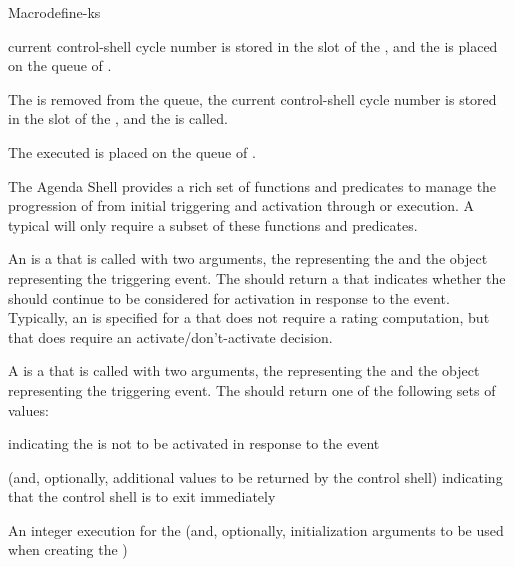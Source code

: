 \documentclass[10pt,twoside,english,pdftex]{article}
\begin{document}
\begin{functiondoc}{Macro}{define-ks}
\begin{tightitemize}
  current control-shell cycle number is stored in the
   slot of the , and the is
  placed on the queue of .
\item The  is removed from the  queue,
  the current control-shell cycle number is stored in the
   slot of the  ,
  and the  is called.
\item The executed  is placed on the queue of
  .
\end{tightitemize}


%
%
%
%
%
%
%
The Agenda Shell provides a rich set of  functions and predicates to
manage the progression of  from initial triggering and activation
through  or execution.  A typical  will only
require a subset of these functions and predicates.

An  is a  that is called with two
arguments, the  representing the  and the
object representing the triggering event.  The
 should return a
 that indicates whether the  should
continue to be considered for activation in response to the event.  Typically,
an  is specified for a  that does
not require a  rating computation, but
that does require an activate/don't-activate decision.

A  is a  that is called with two
arguments, the  representing the  and the
object representing the triggering event.  The
 should return one of the following sets
of values:
\begin{tightitemize}
\item \nil{} indicating the  is not to be activated in response to
  the event
\item {} (and, optionally, additional values to be returned by the
  control shell) indicating that the control shell is to exit immediately
\item An integer execution  for the  (and,
  optionally, initialization arguments to be used when creating the
   )
\end{tightitemize}


\end{functiondoc}
\end{document}

